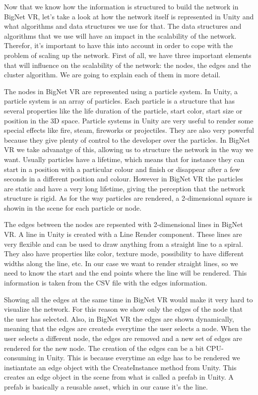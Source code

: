 Now that we know how the information is structured to build the network in BigNet VR, let's take a look at how the network itself is represented in Unity and what algorithms and data structures we use for that. The data structures and algorithms that we use will have an impact in the scalability of the network. Therefor, it's important to have this into account in order to cope with the problem of scaling up the network. First of all, we have three important elements that will influence on the scalability of the network: the nodes, the edges and the cluster algorithm. We are going to explain each of them in more detail.

The nodes in BigNet VR are represented using a particle system. In Unity, a particle system\cite{particle_system} is an array of particles. Each particle is a structure that has several properties like the life duration of the particle, start color, start size or position in the 3D space. Particle systems in Unity are very useful to render some special effects like fire, steam, fireworks or projectiles. They are also very powerful because they give plenty of control to the developer over the particles. In BigNet VR we take advanatge of this, allowing us to structure the network in the way we want. Usually particles have a lifetime, which means that for instance they can start in a position with a particular colour and finish or disappear after a few seconds in a different position and colour. However in BigNet VR the particles are static and have a very long lifetime, giving the perception that the network structure is rigid. As for the way particles are rendered, a 2-dimensional square is showin in the scene for each particle or node.

The edges between the nodes are repsented with 2-dimensional lines in BigNet VR. A line in Unity is created with a Line Render component\cite{line_render}. These lines are very flexible and can be used to draw anything from a straight line to a spiral. They also have properties like color, texture mode, possibility to have different widths along the line, etc. In our case we want to render straight lines, so we need to know the start and the end points where the line will be rendered. This information is taken from the CSV file with the edges information.

Showing all the edges at the same time in BigNet VR would make it very hard to visualize the network. For this reason we show only the edges of the node that the user has selected. Also, in BigNet VR the edges are shown dynamically, meaning that the edges are createds everytime the user selects a node. When the user selects a different node, the edges are removed and a new set of edges are rendered for the new node. The creation of the edges can be a bit CPU-consuming in Unity. This is because everytime an edge has to be rendered we instiantate an edge object with the CreateInstance method from Unity. This creates an edge object in the scene from what is called a prefab in Unity. A prefab\cite{prefab} is basically a reusable asset, which in our cause it's the line.


